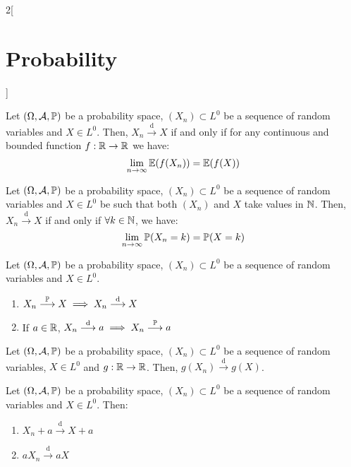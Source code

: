 \documentclass[../../../main.tex]{subfiles}
\begin{document}
\begin{multicols}{2}[\section{Probability}]
\begin{theorem}
    \end{theorem}
    \begin{theorem}
        Let $(\Omega,\mathcal{A},\mathbb{P})$ be a probability space, $(X_n)\subset L^0$ be a sequence of random variables and $X\in L^0$. Then, $X_n\overset{\text{d}}{\longrightarrow} X$ if and only if for any continuous and bounded function $f:\mathbb{R}\rightarrow\mathbb{R}$ we have: $$\lim_{n\to\infty}\mathbb{E}(f(X_n))=\mathbb{E}(f(X))$$
    \end{theorem}
    \begin{lemma}
        Let $(\Omega,\mathcal{A},\mathbb{P})$ be a probability space, $(X_n)\subset L^0$ be a sequence of random variables and $X\in L^0$ be such that both $(X_n)$ and $X$ take values in $\mathbb{N}$. Then, $X_n\overset{\text{d}}{\longrightarrow} X$ if and only if $\forall k\in\mathbb{N}$, we have: $$\lim_{n\to\infty} \mathbb{P}(X_n=k)=\mathbb{P}(X=k)$$
    \end{lemma}
    \begin{prop}
        Let $(\Omega,\mathcal{A},\mathbb{P})$ be a probability space, $(X_n)\subset L^0$ be a sequence of random variables and $X\in L^0$.
        \begin{enumerate}
            \item $X_n\overset{\mathbb{P}}{\longrightarrow} X\implies X_n\overset{\text{d}}{\longrightarrow} X$
            \item If $a\in\mathbb{R}$, $X_n\overset{\text{d}}{\longrightarrow} a\implies X_n\overset{\mathbb{P}}{\longrightarrow} a$
        \end{enumerate}
    \end{prop}
    \begin{prop}
        Let $(\Omega,\mathcal{A},\mathbb{P})$ be a probability space, $(X_n)\subset L^0$ be a sequence of random variables, $X\in L^0$ and $g:\mathbb{R}\rightarrow\mathbb{R}$. Then, $g(X_n)\overset{\text{d}}{\longrightarrow}g(X)$.
    \end{prop}
    \begin{corollary}
        Let $(\Omega,\mathcal{A},\mathbb{P})$ be a probability space, $(X_n)\subset L^0$ be a sequence of random variables and $X\in L^0$. Then:
        \begin{enumerate}
            \item $X_n+a\overset{\text{d}}{\longrightarrow}X+a$
            \item $aX_n\overset{\text{d}}{\longrightarrow}aX$
        \end{enumerate}
    \end{corollary}
    \begin{theorem}

\end{theorem}
\end{multicols}
\end{document}
